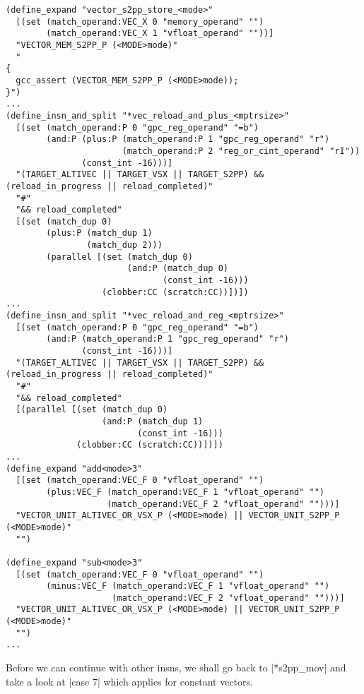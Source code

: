 \begin{lstlisting}
(define_expand "vector_s2pp_store_<mode>"
  [(set (match_operand:VEC_X 0 "memory_operand" "")
        (match_operand:VEC_X 1 "vfloat_operand" ""))]
  "VECTOR_MEM_S2PP_P (<MODE>mode)"
  "
{
  gcc_assert (VECTOR_MEM_S2PP_P (<MODE>mode));
}")
...
(define_insn_and_split "*vec_reload_and_plus_<mptrsize>"
  [(set (match_operand:P 0 "gpc_reg_operand" "=b")
        (and:P (plus:P (match_operand:P 1 "gpc_reg_operand" "r")
                       (match_operand:P 2 "reg_or_cint_operand" "rI"))
               (const_int -16)))]
  "(TARGET_ALTIVEC || TARGET_VSX || TARGET_S2PP) && (reload_in_progress || reload_completed)"
  "#"
  "&& reload_completed"
  [(set (match_dup 0)
        (plus:P (match_dup 1)
                (match_dup 2)))
        (parallel [(set (match_dup 0)
                        (and:P (match_dup 0)
                               (const_int -16)))
                   (clobber:CC (scratch:CC))])])
...
(define_insn_and_split "*vec_reload_and_reg_<mptrsize>"
  [(set (match_operand:P 0 "gpc_reg_operand" "=b")
        (and:P (match_operand:P 1 "gpc_reg_operand" "r")
               (const_int -16)))]
  "(TARGET_ALTIVEC || TARGET_VSX || TARGET_S2PP) && (reload_in_progress || reload_completed)"
  "#"
  "&& reload_completed"
  [(parallel [(set (match_dup 0)
                   (and:P (match_dup 1)
                          (const_int -16)))
              (clobber:CC (scratch:CC))])])
...
(define_expand "add<mode>3"
  [(set (match_operand:VEC_F 0 "vfloat_operand" "")
        (plus:VEC_F (match_operand:VEC_F 1 "vfloat_operand" "")
                    (match_operand:VEC_F 2 "vfloat_operand" "")))]
  "VECTOR_UNIT_ALTIVEC_OR_VSX_P (<MODE>mode) || VECTOR_UNIT_S2PP_P (<MODE>mode)"
  "")

(define_expand "sub<mode>3"
  [(set (match_operand:VEC_F 0 "vfloat_operand" "")
        (minus:VEC_F (match_operand:VEC_F 1 "vfloat_operand" "")
                     (match_operand:VEC_F 2 "vfloat_operand" "")))]
  "VECTOR_UNIT_ALTIVEC_OR_VSX_P (<MODE>mode) || VECTOR_UNIT_S2PP_P (<MODE>mode)"
  "")
...
\end{lstlisting}

Before we can continue with other insns, we shall go back to |*s2pp_mov| and take a look at |case 7| which applies for constant vectors.

